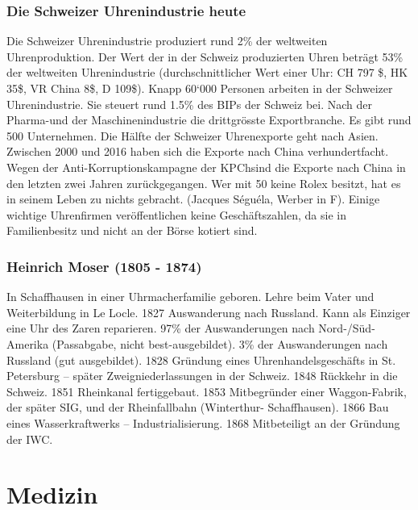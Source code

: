 \documentclass[10pt, openright=true]{scrartcl}
\begin{document}
\subsubsection{Die Schweizer Uhrenindustrie heute}
Die Schweizer Uhrenindustrie produziert rund 2\% der weltweiten Uhrenproduktion. Der Wert der in der Schweiz produzierten Uhren beträgt 53\% der weltweiten Uhrenindustrie (durchschnittlicher Wert einer Uhr: CH 797 \$, HK 35\$, VR China 8\$, D 109\$). Knapp 60‘000 Personen arbeiten in der Schweizer Uhrenindustrie. Sie steuert rund 1.5\% des BIPs der Schweiz bei. Nach der Pharma-und der Maschinenindustrie die drittgrösste Exportbranche. Es gibt rund 500 Unternehmen. Die Hälfte der Schweizer Uhrenexporte geht nach Asien. Zwischen 2000 und 2016 haben sich die Exporte nach China verhundertfacht. Wegen der Anti-Korruptionskampagne der KPChsind die Exporte nach China in den letzten zwei Jahren zurückgegangen. Wer mit 50 keine Rolex besitzt, hat es in seinem Leben zu nichts gebracht. (Jacques Séguéla, Werber in F). Einige wichtige Uhrenfirmen veröffentlichen keine Geschäftszahlen, da sie in Familienbesitz und nicht an der Börse kotiert sind.
\subsubsection{Heinrich Moser (1805 - 1874)}
In Schaffhausen in einer Uhrmacherfamilie geboren. Lehre beim Vater und Weiterbildung in Le Locle. 1827 Auswanderung nach Russland. Kann als Einziger eine Uhr des Zaren reparieren. 97\% der Auswanderungen nach Nord-/Süd-Amerika (Passabgabe, nicht best-ausgebildet). 3\% der Auswanderungen nach Russland (gut ausgebildet). 1828 Gründung eines Uhrenhandelsgeschäfts in St. Petersburg – später Zweigniederlassungen in der Schweiz. 1848 Rückkehr in die Schweiz. 1851 Rheinkanal fertiggebaut. 1853 Mitbegründer einer Waggon-Fabrik, der später SIG, und der Rheinfallbahn (Winterthur- Schaffhausen). 1866 Bau eines Wasserkraftwerks – Industrialisierung. 1868 Mitbeteiligt an der Gründung der IWC.
\section{Medizin}
\end{document}
